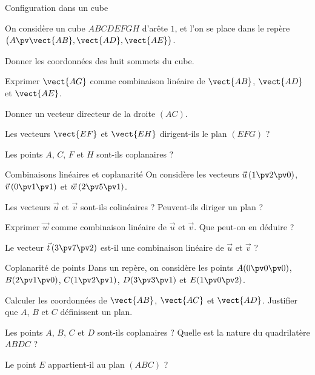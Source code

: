 
\begin{exercice}[2]{Configuration dans un cube}
\begin{codecote}[0.62]
On considère un cube $ABCDEFGH$ d'arête $1$, et l'on se place dans le repère $\big(A\pv\vect{AB},\vect{AD},\vect{AE}\big)$.
\begin{questions}
  \item Donner les coordonnées des huit sommets du cube.
  \item Exprimer $\vect{AG}$ comme combinaison linéaire de $\vect{AB}$, $\vect{AD}$ et $\vect{AE}$.
  \item Donner un vecteur directeur de la droite $(AC)$.
  \item Les vecteurs $\vect{EF}$ et $\vect{EH}$ dirigent-ils le plan $(EFG)$ ?
  \item Les points $A$, $C$, $F$ et $H$ sont-ils coplanaires ?
\end{questions}
\cote
\centering
{}
\end{codecote}
\end{exercice}

\begin{exercice}[2]{Combinaisons linéaires et coplanarité}
On considère les vecteurs $\vec u\,(1\pv2\pv0)$, $\vec v\,(0\pv1\pv1)$ et $\vec w\,(2\pv5\pv1)$.
\begin{questions}
  \item Les vecteurs $\vec u$ et $\vec v$ sont-ils colinéaires ? Peuvent-ils diriger un plan ?
  \item Exprimer $\vec w$ comme combinaison linéaire de $\vec u$ et $\vec v$. Que peut-on en déduire ?
  \item Le vecteur $\vec t\,(3\pv7\pv2)$ est-il une combinaison linéaire de $\vec u$ et $\vec v$ ?
\end{questions}
\end{exercice}

\begin{exercice}[2]{Coplanarité de points}
Dans un repère, on considère les points $A(0\pv0\pv0)$, $B(2\pv1\pv0)$, $C(1\pv2\pv1)$, $D(3\pv3\pv1)$ et $E(1\pv0\pv2)$.
\begin{questions}
  \item Calculer les coordonnées de $\vect{AB}$, $\vect{AC}$ et $\vect{AD}$. Justifier que $A$, $B$ et $C$ définissent un plan.
  \item Les points $A$, $B$, $C$ et $D$ sont-ils coplanaires ? Quelle est la nature du quadrilatère $ABDC$ ?
  \item Le point $E$ appartient-il au plan $(ABC)$ ?
\end{questions}
\end{exercice}

